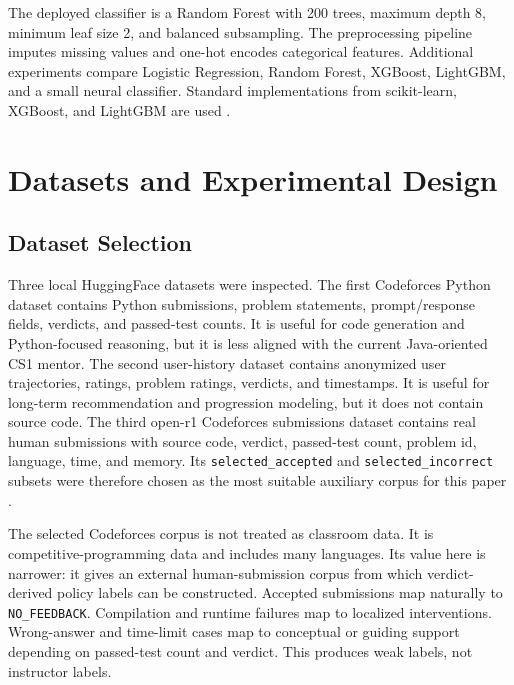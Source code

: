 \documentclass[twoside, 11pt]{article}
\begin{document}
The deployed classifier is a Random Forest with 200 trees, maximum depth 8, minimum leaf size 2, and balanced subsampling. The preprocessing pipeline imputes missing values and one-hot encodes categorical features. Additional experiments compare Logistic Regression, Random Forest, XGBoost, LightGBM, and a small neural classifier. Standard implementations from scikit-learn, XGBoost, and LightGBM are used \cite{breiman2001,pedregosa2011,chen2016,ke2017}.

\section{\large Datasets and Experimental Design}

\subsection{Dataset Selection}

Three local HuggingFace datasets were inspected. The first Codeforces Python dataset contains Python submissions, problem statements, prompt/response fields, verdicts, and passed-test counts. It is useful for code generation and Python-focused reasoning, but it is less aligned with the current Java-oriented CS1 mentor. The second user-history dataset contains anonymized user trajectories, ratings, problem ratings, verdicts, and timestamps. It is useful for long-term recommendation and progression modeling, but it does not contain source code. The third open-r1 Codeforces submissions dataset contains real human submissions with source code, verdict, passed-test count, problem id, language, time, and memory. Its \texttt{selected\_accepted} and \texttt{selected\_incorrect} subsets were therefore chosen as the most suitable auxiliary corpus for this paper \cite{penedo2025}.

The selected Codeforces corpus is not treated as classroom data. It is competitive-programming data and includes many languages. Its value here is narrower: it gives an external human-submission corpus from which verdict-derived policy labels can be constructed. Accepted submissions map naturally to \texttt{NO\_FEEDBACK}. Compilation and runtime failures map to localized interventions. Wrong-answer and time-limit cases map to conceptual or guiding support depending on passed-test count and verdict. This produces weak labels, not instructor labels.
\end{document}
